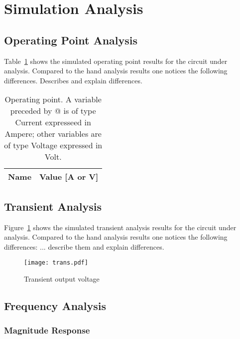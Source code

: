 \section{Simulation Analysis}
\label{sec:simulation}

\subsection{Operating Point Analysis}

Table~\ref{tab:op} shows the simulated operating point results for the
circuit under analysis. Compared to the hand analysis results one notices the
following differences. Describes and explain differences.

\begin{table}[h]
  \centering
  \begin{tabular}{|l|r|}
    \hline    
    {\bf Name} & {\bf Value [A or V]} \\ \hline
    
  \end{tabular}
  \caption{Operating point. A variable preceded by @ is of type Current
    expresseed in Ampere; other variables are of type Voltage expressed in
    Volt.}
  \label{tab:op}
\end{table}

\lipsum[1-2]


\subsection{Transient Analysis}

Figure~\ref{fig:trans} shows the simulated transient analysis results for the
circuit under analysis. Compared to the hand analysis results one notices the
following differences: ... describe them and explain differences.

\begin{figure}[h] \centering
\texttt{[image: trans.pdf]}
\caption{Transient output voltage}
\label{fig:trans}
\end{figure}

\lipsum[1-2]



\subsection{Frequency Analysis}

\subsubsection{Magnitude Response}

